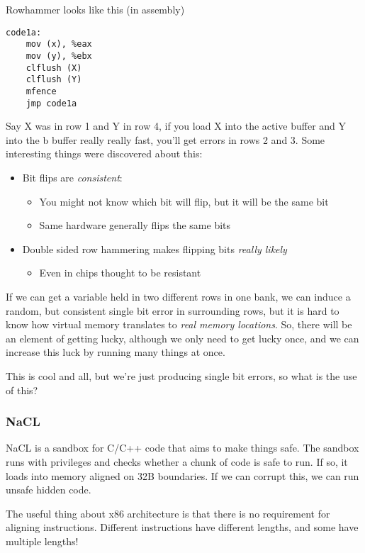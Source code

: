 \documentclass[11pt,a4paper,titlepage,dvipsnames,cmyk]{scrartcl}
\begin{document}
Rowhammer looks like this (in assembly)
\begin{lstlisting}
code1a:
    mov (x), %eax
    mov (y), %ebx
    clflush (X)
    clflush (Y)
    mfence
    jmp code1a
\end{lstlisting}

Say X was in row 1 and Y in row 4, if you load X into the active buffer and Y into the b buffer really really fast, you'll get errors in rows 2 and 3. Some interesting things were discovered about this:
\begin{itemize}
    \item Bit flips are \textit{consistent}:
    \begin{itemize}
        \item You might not know which bit will flip, but it will be the same bit
        \item Same hardware generally flips the same bits
    \end{itemize}
    \item Double sided row hammering makes flipping bits \textit{really likely}
    \begin{itemize}
        \item Even in chips thought to be resistant
    \end{itemize}
\end{itemize}

If we can get a variable held in two different rows in one bank, we can induce a random, but consistent single bit error in surrounding rows, but it is hard to know how virtual memory translates to \textit{real memory locations}. So, there will be an element of getting lucky, although we only need to get lucky once, and we can increase this luck by running many things at once.

This is cool and all, but we're just producing single bit errors, so what is the use of this?

\subsubsection{NaCL}
NaCL is a sandbox for C/C++ code that aims to make things safe. The sandbox runs with privileges and checks whether a chunk of code is safe to run. If so, it loads into memory aligned on 32B boundaries. If we can corrupt this, we can run unsafe hidden code.

The useful thing about x86 architecture is that there is no requirement for aligning instructions. Different instructions have different lengths, and some have multiple lengths!
\end{document}
